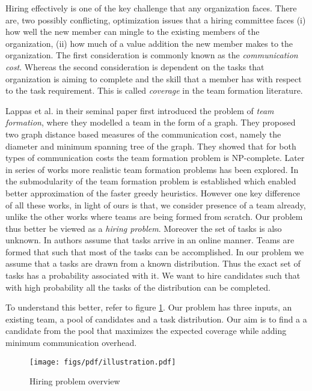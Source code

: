 Hiring effectively is one of the key challenge that any organization faces. There are, two possibly conflicting, optimization issues that a hiring committee faces (i) how well the new member can mingle to the existing members of the organization, (ii) how much of a value addition the new member makes to the organization. The first consideration is commonly known as the \textit{communication cost}. Whereas the second consideration is dependent on the tasks that organization is aiming to complete and the skill that a member has with respect to the task requirement. This is called \textit{coverage} in the team formation literature. 

Lappas et al. \cite{lappas2009finding} in their seminal paper first introduced the problem of \textit{team formation}, where they modelled a team in the form of a graph. They proposed two graph distance based measures of the communication cost, namely the diameter and minimum spanning tree of the graph. They showed that for both types of communication costs the team formation problem is NP-complete. Later in series of works \cite{sozio2010community,kargar2011discovering,anagnostopoulos2010power,rangapuram2013towards} more realistic team  formation problems has been explored. In \cite{bhowmik2014submodularity} the submodularity of the team formation problem is established which enabled better approximation of the faster greedy heuristics. However one key difference of all these works, in light of ours is that, we consider presence of a team already, unlike the other works where teams are being formed from scratch. Our problem thus better be viewed as a \textit{hiring problem}. Moreover the set of tasks is also unknown. In \cite{anagnostopoulos2012online} authors assume that tasks arrive in an online manner. Teams are formed that such that most of the tasks can be accomplished. In our problem we assume that a tasks are drawn from a known distribution. Thus the exact set of tasks has a probability associated with it. We want to hire candidates such that with high probability all the tasks of the distribution can be completed.

To understand this better, refer to figure \ref{fig:hpo}. Our problem has three inputs, an existing team, a pool of candidates and a task distribution. Our aim is to find a a candidate from the pool that maximizes the expected coverage while adding minimum communication overhead. 
\begin{figure}
\centering
\begin{small}
\texttt{[image: figs/pdf/illustration.pdf]}
\caption{Hiring problem overview}
\label{fig:hpo}
\end{small}
\end{figure} 

